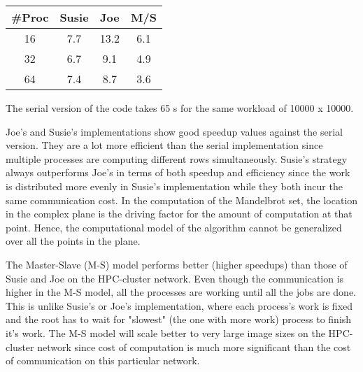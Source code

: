 \begin{center}
	\begin{tabular}{||c c c c||} 
		\hline
		\#Proc & Susie & Joe & M/S \\ [0.5ex] 
		\hline\hline
		16 & 7.7 & 13.2 & 6.1 \\ 
		\hline
		32 & 6.7 & 9.1 & 4.9 \\
		\hline
		64 & 7.4 & 8.7 & 3.6 \\
		\hline
	\end{tabular}
\end{center}

The serial version of the code takes 65 s for the same workload of 10000 x 10000.

Joe's and Susie's implementations show good speedup values against the serial version. They are a lot more efficient than the serial implementation since multiple processes are computing different rows simultaneously. Susie's strategy always outperforms Joe's in terms of both speedup and efficiency since the work is distributed more evenly in Susie's implementation while they both incur the same communication cost. In the computation of the Mandelbrot set, the location in the complex plane is the driving factor for the amount of computation at that point. Hence, the computational model of the algorithm cannot be generalized over all the points in the plane.

The Master-Slave (M-S) model performs better (higher speedups) than those of Susie and Joe on the HPC-cluster network. Even though the communication is higher in the M-S model, all the processes are working until all the jobs are done. This is unlike Susie's or Joe's implementation, where each process's work is fixed and the root has to wait for "slowest" (the one with more work) process to finish it's work. The M-S model will scale better to very large image sizes on the HPC-cluster network since cost of computation is much more significant than the cost of communication on this particular network. 
